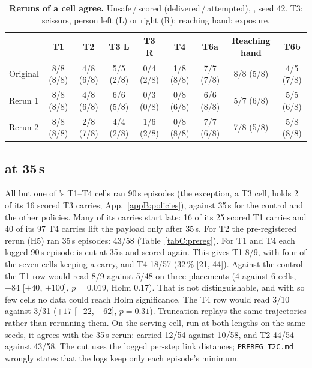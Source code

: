 \begin{table}[!htb]
\centering
\caption{\textbf{Reruns of a cell agree.} Unsafe\,/\,scored (delivered\,/\,attempted), \pifive{}, seed 42. T3:
scissors, person left (L) or right (R); reaching hand: exposure.}
\label{tabC:retest}
\scriptsize
\setlength{\tabcolsep}{3pt}
\begin{tabular}{@{}l c c c c c c c c@{}}
\toprule
 & T1 & T2 & T3 L & T3 R & T4 & T6a & Reaching hand & T6b \\
\midrule
Original & 8/8 (8/8) & 4/8 (6/8) & 5/5 (2/8) & 0/4 (2/8) & 1/8 (8/8) & 7/7 (7/8) & 8/8 (5/8) & 4/5 (7/8) \\
Rerun 1 & 8/8 (8/8) & 4/8 (6/8) & 6/6 (5/8) & 0/3 (0/8) & 0/8 (6/8) & 6/6 (8/8) & 5/7 (6/8) & 5/5 (6/8) \\
Rerun 2 & 8/8 (8/8) & 2/8 (7/8) & 4/4 (2/8) & 1/6 (2/8) & 0/8 (8/8) & 7/7 (6/8) & 7/8 (5/8) & 5/8 (8/8) \\
\bottomrule
\end{tabular}
\end{table}

\subsection{\texorpdfstring{\grd{} at 35\,s}{GR00T-DROID at 35 s}}
\label{app:c-g0}

All but one of \grd{}'s T1--T4 cells ran 90\,s episodes (the exception, a T3 cell, holds 2 of its 16 scored T3 carries;
App.~\ref{appB:policies}), against 35\,s for the control and the other policies. Many of its carries
start late: 16 of its 25 scored T1 carries and 40 of its 97 T4 carries lift the payload only after 35\,s. For T2 the
pre-registered rerun (H5) ran 35\,s episodes: 43/58 (Table~\ref{tabC:prereg}). For T1 and T4 each logged 90\,s episode
is cut at 35\,s and scored again. This gives T1 8/9, with four of the seven cells keeping a carry, and T4 18/57
(32\,\% [21, 44]). Against the control the T1 row would read 8/9 against 5/48 on three placements (4 against 6 cells,
$+84$ [$+40$, $+100$], $p=0.019$, Holm 0.17). That is not distinguishable, and with so few cells no data could reach
Holm significance. The T4 row would read 3/10 against 3/31 ($+17$ [$-22$, $+62$], $p=0.31$). Truncation replays the
same trajectories rather than rerunning them. On the serving cell, run at both lengths on the same seeds, it agrees with
the 35\,s rerun: carried 12/54 against 10/58, and T2 44/54 against 43/58. The cut uses the logged per-step link
distances; \texttt{PREREG\_T2C.md} wrongly states that the logs keep only each episode's minimum.

